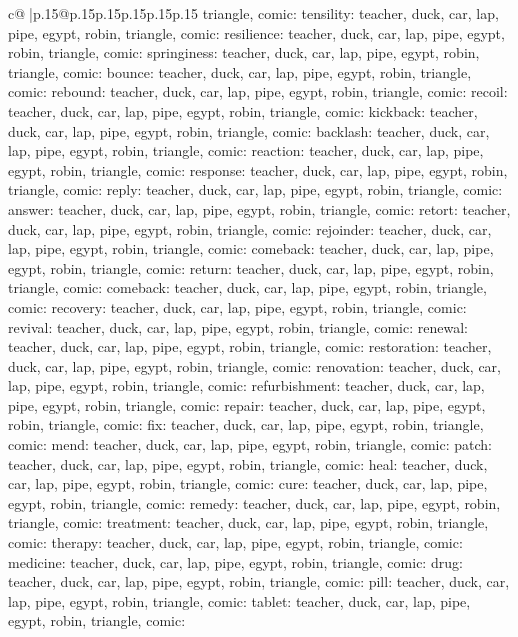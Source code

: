 \documentclass{article}
\begin{document}
{\begin{supertabular}{c@{$\;$}|p{.15\linewidth}@{}p{.15\linewidth}p{.15\linewidth}p{.15\linewidth}p{.15\linewidth}p{.15\linewidth}}
{{{triangle, comic\n\nCLUE: tensility\nTARGETS: teacher, duck, car, lap, pipe, egypt, robin, triangle, comic\n\nCLUE: resilience\nTARGETS: teacher, duck, car, lap, pipe, egypt, robin, triangle, comic\n\nCLUE: springiness\nTARGETS: teacher, duck, car, lap, pipe, egypt, robin, triangle, comic\n\nCLUE: bounce\nTARGETS: teacher, duck, car, lap, pipe, egypt, robin, triangle, comic\n\nCLUE: rebound\nTARGETS: teacher, duck, car, lap, pipe, egypt, robin, triangle, comic\n\nCLUE: recoil\nTARGETS: teacher, duck, car, lap, pipe, egypt, robin, triangle, comic\n\nCLUE: kickback\nTARGETS: teacher, duck, car, lap, pipe, egypt, robin, triangle, comic\n\nCLUE: backlash\nTARGETS: teacher, duck, car, lap, pipe, egypt, robin, triangle, comic\n\nCLUE: reaction\nTARGETS: teacher, duck, car, lap, pipe, egypt, robin, triangle, comic\n\nCLUE: response\nTARGETS: teacher, duck, car, lap, pipe, egypt, robin, triangle, comic\n\nCLUE: reply\nTARGETS: teacher, duck, car, lap, pipe, egypt, robin, triangle, comic\n\nCLUE: answer\nTARGETS: teacher, duck, car, lap, pipe, egypt, robin, triangle, comic\n\nCLUE: retort\nTARGETS: teacher, duck, car, lap, pipe, egypt, robin, triangle, comic\n\nCLUE: rejoinder\nTARGETS: teacher, duck, car, lap, pipe, egypt, robin, triangle, comic\n\nCLUE: comeback\nTARGETS: teacher, duck, car, lap, pipe, egypt, robin, triangle, comic\n\nCLUE: return\nTARGETS: teacher, duck, car, lap, pipe, egypt, robin, triangle, comic\n\nCLUE: comeback\nTARGETS: teacher, duck, car, lap, pipe, egypt, robin, triangle, comic\n\nCLUE: recovery\nTARGETS: teacher, duck, car, lap, pipe, egypt, robin, triangle, comic\n\nCLUE: revival\nTARGETS: teacher, duck, car, lap, pipe, egypt, robin, triangle, comic\n\nCLUE: renewal\nTARGETS: teacher, duck, car, lap, pipe, egypt, robin, triangle, comic\n\nCLUE: restoration\nTARGETS: teacher, duck, car, lap, pipe, egypt, robin, triangle, comic\n\nCLUE: renovation\nTARGETS: teacher, duck, car, lap, pipe, egypt, robin, triangle, comic\n\nCLUE: refurbishment\nTARGETS: teacher, duck, car, lap, pipe, egypt, robin, triangle, comic\n\nCLUE: repair\nTARGETS: teacher, duck, car, lap, pipe, egypt, robin, triangle, comic\n\nCLUE: fix\nTARGETS: teacher, duck, car, lap, pipe, egypt, robin, triangle, comic\n\nCLUE: mend\nTARGETS: teacher, duck, car, lap, pipe, egypt, robin, triangle, comic\n\nCLUE: patch\nTARGETS: teacher, duck, car, lap, pipe, egypt, robin, triangle, comic\n\nCLUE: heal\nTARGETS: teacher, duck, car, lap, pipe, egypt, robin, triangle, comic\n\nCLUE: cure\nTARGETS: teacher, duck, car, lap, pipe, egypt, robin, triangle, comic\n\nCLUE: remedy\nTARGETS: teacher, duck, car, lap, pipe, egypt, robin, triangle, comic\n\nCLUE: treatment\nTARGETS: teacher, duck, car, lap, pipe, egypt, robin, triangle, comic\n\nCLUE: therapy\nTARGETS: teacher, duck, car, lap, pipe, egypt, robin, triangle, comic\n\nCLUE: medicine\nTARGETS: teacher, duck, car, lap, pipe, egypt, robin, triangle, comic\n\nCLUE: drug\nTARGETS: teacher, duck, car, lap, pipe, egypt, robin, triangle, comic\n\nCLUE: pill\nTARGETS: teacher, duck, car, lap, pipe, egypt, robin, triangle, comic\n\nCLUE: tablet\nTARGETS: teacher, duck, car, lap, pipe, egypt, robin, triangle, comic\n\nCLUE: }}}
\end{supertabular}}
\end{document}

